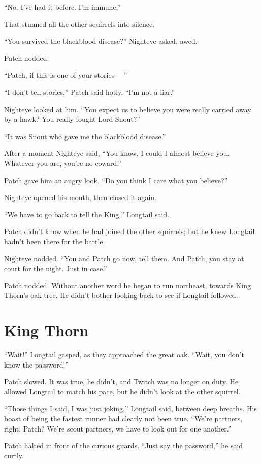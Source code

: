 \documentclass[ebook,oneside,openany,12pt]{memoir}
\begin{document}
“No. I’ve had it before. I’m immune.”

That stunned all the other squirrels into silence.

“You survived the blackblood disease?” Nighteye asked, awed.

Patch nodded.

“Patch, if this is one of your stories —”

“I don’t tell stories,” Patch said hotly. “I’m not a liar.”

Nighteye looked at him. “You expect us to believe you were really
carried away by a hawk? You really fought Lord Snout?”

“It was Snout who gave me the blackblood disease.”

After a moment Nighteye said, “You know, I could I almost believe
you. Whatever you are, you’re no coward.”

Patch gave him an angry look. “Do you think I care what you believe?”

Nighteye opened his mouth, then closed it again.

“We have to go back to tell the King,” Longtail said.

Patch didn’t know when he had joined the other squirrels; but he knew
Longtail hadn’t been there for the battle.

Nighteye nodded. “You and Patch go now, tell them. And Patch, you stay
at court for the night. Just in case.”

Patch nodded. Without another word he began to run northeast, towards
King Thorn’s oak tree. He didn’t bother looking back to see if
Longtail followed.


\section{King Thorn}

“Wait!” Longtail gasped, as they approached the great oak. “Wait, you
don’t know the password!”

Patch slowed. It was true, he didn’t, and Twitch was no longer on
duty. He allowed Longtail to match his pace, but he didn’t look at the
other squirrel.

“Those things I said, I was just joking,” Longtail said, between deep
breaths. His boast of being the fastest runner had clearly not been
true. “We’re partners, right, Patch? We’re scout partners, we have to
look out for one another.”

Patch halted in front of the curious guards. “Just say the password,”
he said curtly.
\end{document}
